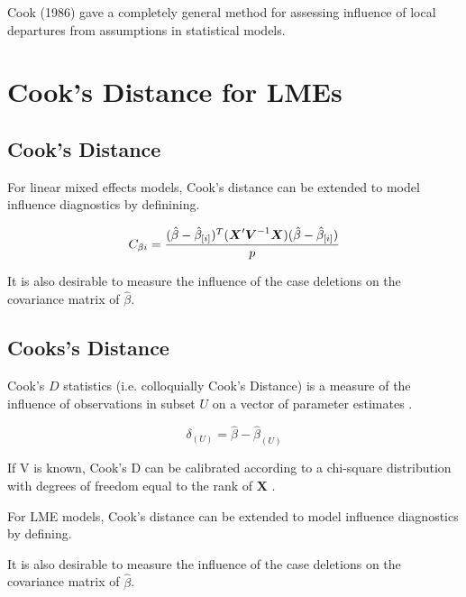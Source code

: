 \documentclass[12pt, a4paper]{report}
\theoremstyle{plain}
\theoremstyle{definition}
\theoremstyle{remark}
\begin{document}
Cook (1986) gave a completely general method for assessing influence of local departures from
assumptions in statistical models.



		
		
		
		
		\section{Cook's Distance for LMEs} %
	
	
		

\subsection{Cook's Distance}%

For linear mixed effects models, Cook's distance can be extended to model influence diagnostics by definining.

\[ C_{\beta i} = {(\hat{\beta} - \hat{\beta}_{[i]})^{T}(\boldsymbol{X}^{\prime}\boldsymbol{V}^{-1}\boldsymbol{X}) (\hat{\beta} - \hat{\beta}_{[i]}) \over p}\]

It is also desirable to measure the influence of the case deletions on the covariance matrix of $\hat{\beta}$.







\subsection{Cooks's Distance}%
 Cook's $D$ statistics (i.e. colloquially Cook's Distance) is a measure of the influence of observations in subset $U$ on a vector of parameter estimates \citep{cook77}.

\[ \delta_{(U)} = \hat{\beta} - \hat{\beta}_{(U)}\]

If V is known, Cook's D can be calibrated according to a chi-square distribution with degrees of freedom equal to the rank of $\boldsymbol{X}$ \citep{cpj92}.


For LME models, Cook's distance can be extended to model influence diagnostics by defining.


It is also desirable to measure the influence of the case deletions on the covariance matrix of $\hat{\beta}$.

\newpage


\end{document}
